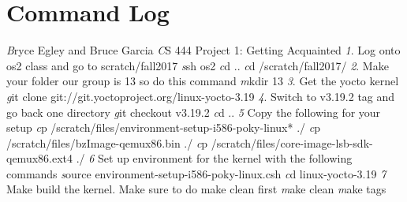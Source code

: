 \documentclass{article}
\begin{document}
\section*{Command Log}
\vspace{0.25in}
\textit Bryce Egley and Bruce Garcia
\newline
\textit CS 444 Project 1: Getting Acquainted
\newline
\textit 1. Log onto os2 class and go to scratch/fall2017
\newline
\textit ssh os2
\newline
\textit cd ..
\newline
\textit cd /scratch/fall2017/
\newline
\newline
\textit 2. Make your folder our group is 13 so do this command
\newline
\textit mkdir 13
\newline
\newline
\textit 3. Get the yocto kernel
\newline
\textit git clone git://git.yoctoproject.org/linux-yocto-3.19
\newline
\newline
\textit 4. Switch to v3.19.2 tag and go back one directory
\newline
\textit git checkout v3.19.2
\newline
\textit cd ..
\newline
\newline
\textit 5 Copy the following for your setup
\newline
\textit cp /scratch/files/environment-setup-i586-poky-linux* ./
\newline
\textit cp /scratch/files/bzImage-qemux86.bin ./
\newline
\textit cp /scratch/files/core-image-lsb-sdk-qemux86.ext4 ./
\newline
\newline
\textit 6 Set up environment for the kernel with the following commands
\newline
\textit source environment-setup-i586-poky-linux.csh
\newline
\textit cd linux-yocto-3.19
\newline
\newline
\textit 7 Make build the kernel. Make sure to do make clean first
\newline
\textit make clean
\newline
\textit make tags
\newline
\end{document}

